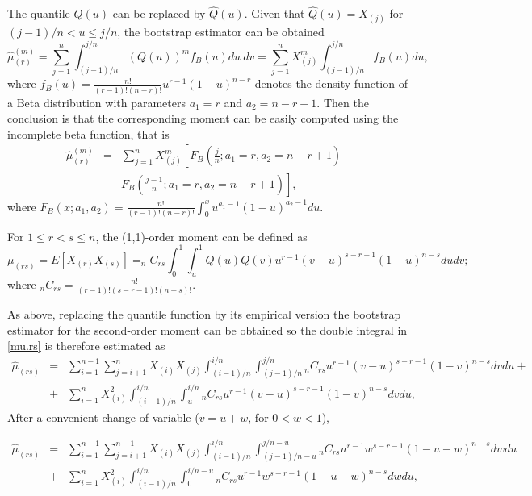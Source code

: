 \documentclass[preprint,12pt]{elsarticle}
\begin{document}
The quantile $ Q(u)$ can be replaced by $\widehat{Q}(u)$. Given that $\widehat{Q}(u)= X_{(j)}$ for $(j-1)/n < u \leq j/n$,  the bootstrap estimator can be obtained
\begin{equation}\label{mu.hat}
\widehat{\mu}_{(r)}^{(m)}=\sum_{j=1}^n\int_{(j-1)/n}^{j/n}(Q(u))^m f_B(u)du \ dv=\sum_{j=1}^n X_{(j)}^m\int_{(j-1)/n}^{j/n} f_B(u)du,
\end{equation}
where $f_B(u)=\frac{n!}{(r-1)!(n-r)!} u^{r-1}(1-u)^{n-r}$ denotes the density function of a Beta distribution with parameters $a_1=r$ and $a_2=n-r+1$. Then the conclusion is that the corresponding moment can be easily computed using the incomplete beta function, that is
\begin{eqnarray*}%
\widehat{\mu}_{(r)}^{(m)}&=&\sum_{j=1}^n X_{(j)}^m\left[F_B\left(\frac{j}{n};a_1=r,a_2=n-r+1\right)- \right.\\
\qquad && \left. F_B\left(\frac{j-1}{n};a_1=r,a_2=n-r+1\right)\right],
\end{eqnarray*}
where $F_B(x;a_1,a_2)=\frac{n!}{(r-1)!(n-r)!}\int_0^x u^{a_1-1}(1-u)^{a_2-1} du$.

\bigskip
For $1 \leq r < s \leq n$, the (1,1)-order moment can be defined as 
\begin{equation}\label{mu.rs}
\mu_{(rs)}=E\left[X_{(r)}X_{(s)}\right]= _nC_{rs} \int_0^1\int_u^{1} Q(u)Q(v) u^{r-1}(v-u)^{s-r-1}(1-u)^{n-s}dudv;
\end{equation}
where $_nC_{rs}=\frac{n!}{(r-1)!(s-r-1)!(n-s)!}$.


As above, replacing the quantile function by its empirical version the bootstrap estimator for the second-order moment can be obtained so the double integral in \eqref{mu.rs} is therefore estimated as
\begin{eqnarray}\label{mu.rs.hat1}
\nonumber \widehat{\mu}_{(rs)}&=& \sum_{i=1}^{n-1}\sum_{j=i+1}^{n} X_{(i)}X_{(j)} \int_{(i-1)/n}^{i/n} \int_{(j-1)/n}^{j/n}{_n}C_{rs}  u^{r-1}(v-u)^{s-r-1}(1-v)^{n-s}dvdu +\\
&+&  \sum_{i=1}^n X_{(i)}^2\int_{(i-1)/n}^{i/n}\int_{u}^{i/n} {_n}C_{rs} u^{r-1}(v-u)^{s-r-1}(1-v)^{n-s}dvdu,
\end{eqnarray}
After a convenient change of variable  ($v=u+w$, for $0<w<1$), 

\begin{eqnarray}\label{mu.rs.hat2}
\nonumber \widehat{\mu}_{(rs)}&=& \sum_{i=1}^{n-1} \sum_{j=i+1}^{n-1} X_{(i)}X_{(j)} \int_{(i-1)/n}^{i/n}\int_{(j-1)/n-u}^{j/n-u}{_n}C_{rs}  u^{r-1}w^{s-r-1}(1-u-w)^{n-s}dwdu \\
&+&  \sum_{i=1}^n X_{(i)}^2\int_{(i-1)/n}^{i/n}\int_{0}^{i/n-u} {_n}C_{rs} u^{r-1}w^{s-r-1}(1-u-w)^{n-s}dwdu,
\end{eqnarray}
\end{document}
